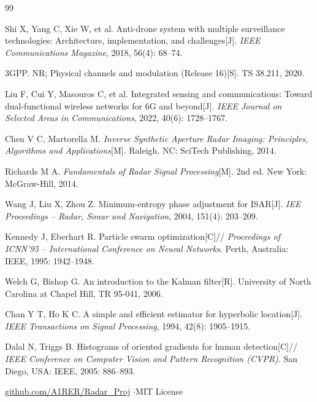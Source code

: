 \documentclass[12pt, a4paper]{article}
\begin{document}
\newpage
\begin{thebibliography}{99}

Shi X, Yang C, Xie W, et al.
Anti-drone system with multiple surveillance technologies: Architecture, implementation, and challenges[J].
\textit{IEEE Communications Magazine}, 2018, 56(4): 68--74.

3GPP.
NR; Physical channels and modulation (Release 16)[S].
TS 38.211, 2020.

Liu F, Cui Y, Masouros C, et al.
Integrated sensing and communications: Toward dual-functional wireless networks for 6G and beyond[J].
\textit{IEEE Journal on Selected Areas in Communications}, 2022, 40(6): 1728--1767.

Chen V C, Martorella M.
\textit{Inverse Synthetic Aperture Radar Imaging: Principles, Algorithms and Applications}[M].
Raleigh, NC: SciTech Publishing, 2014.

Richards M A.
\textit{Fundamentals of Radar Signal Processing}[M].
2nd ed. New York: McGraw-Hill, 2014.

Wang J, Liu X, Zhou Z.
Minimum-entropy phase adjustment for ISAR[J].
\textit{IEE Proceedings -- Radar, Sonar and Navigation}, 2004, 151(4): 203--209.

Kennedy J, Eberhart R.
Particle swarm optimization[C]//
\textit{Proceedings of ICNN'95 -- International Conference on Neural Networks}.
Perth, Australia: IEEE, 1995: 1942--1948.

Welch G, Bishop G.
An introduction to the Kalman filter[R].
University of North Carolina at Chapel Hill, TR 95-041, 2006.

Chan Y T, Ho K C.
A simple and efficient estimator for hyperbolic location[J].
\textit{IEEE Transactions on Signal Processing}, 1994, 42(8): 1905--1915.

Dalal N, Triggs B.
Histograms of oriented gradients for human detection[C]//
\textit{IEEE Conference on Computer Vision and Pattern Recognition (CVPR)}.
San Diego, USA: IEEE, 2005: 886--893.

\end{thebibliography}

\vspace{1.5cm}
\begin{center}
  \color{gray}\small
  \href{https://github.com/A1RER/Radar_Proj}{github.com/A1RER/Radar\_Proj}
  \quad$\cdot$\quad MIT License
\end{center}
\end{document}
